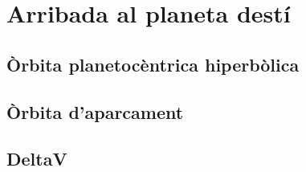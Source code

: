 \chapter{Arribada al planeta destí}

\section{Òrbita planetocèntrica hiperbòlica}
\section{Òrbita d'aparcament}
\section{DeltaV}
